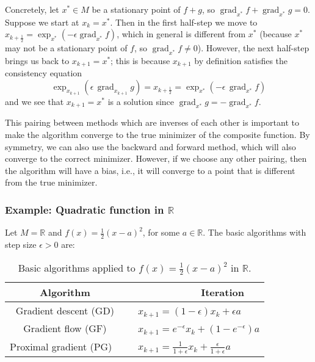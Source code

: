 \documentclass[final,12pt]{colt2018}
\newcommand{\R}{\mathbb{R}}
\DeclareMathOperator{\grad}{grad}
\newcommand{\M}{{M}}
\begin{document}
Concretely, let $x^\ast \in \M$ be a stationary point of $f+g$, so $\grad_{x^\ast} f + \grad_{x^\ast} g = 0$.
Suppose we start at $x_k = x^\ast$.
Then in the first half-step we move to $x_{k+\frac{1}{2}} = \exp_{x^\ast}(-\epsilon \grad_{x^\ast} f)$, which in general is different from $x^\ast$ (because $x^\ast$ may not be a stationary point of $f$, so $\grad_{x^\ast} f \neq 0$).
However, the next half-step brings us back to $x_{k+1} = x^\ast$; this is because $x_{k+1}$ by definition satisfies the consistency equation 
$$\exp_{x_{k+1}}(\epsilon \, \grad_{x_{k+1}} g) = x_{k+\frac{1}{2}} = \exp_{x^\ast}(-\epsilon \, \grad_{x^\ast} f)$$
and we see that $x_{k+1} = x^\ast$ is a solution since $\grad_{x^\ast} g = -\grad_{x^\ast} f$.

This pairing between methods which are inverses of each other is important to make the algorithm converge to the true minimizer of the composite function.
By symmetry, we can also use the backward and forward method, which will also converge to the correct minimizer.
However, if we choose any other pairing, then the algorithm will have a bias, i.e., it will converge to a point that is different from the true minimizer.


\subsubsection{Example: Quadratic function in $\R$}

Let $\M = \R$ and $f(x) = \frac{1}{2} (x-a)^2$, for some $a \in \R$.
The basic algorithms with step size $\epsilon > 0$ are:

\renewcommand{\arraystretch}{1.1}
\begin{table}[h!]
\begin{center}
    \begin{tabular}[h!t]{c | l}
    Algorithm & ~~~~~~~~~~~~ Iteration \\
    \hline
    Gradient descent (GD) & ~ $x_{k+1} = (1-\epsilon) x_k + \epsilon a$ \\
    Gradient flow (GF) & ~ $x_{k+1} = e^{-\epsilon} x_k + (1-e^{-\epsilon}) a$ \\
    Proximal gradient (PG) ~ & ~ $x_{k+1} = \frac{1}{1+\epsilon} x_k + \frac{\epsilon}{1+\epsilon} a$
    \end{tabular}
\caption{\footnotesize Basic algorithms applied to $f(x) = \frac{1}{2}(x-a)^2$ in $\R$.}
\label{Tab:quad}
\end{center}
\end{table}
\end{document}
